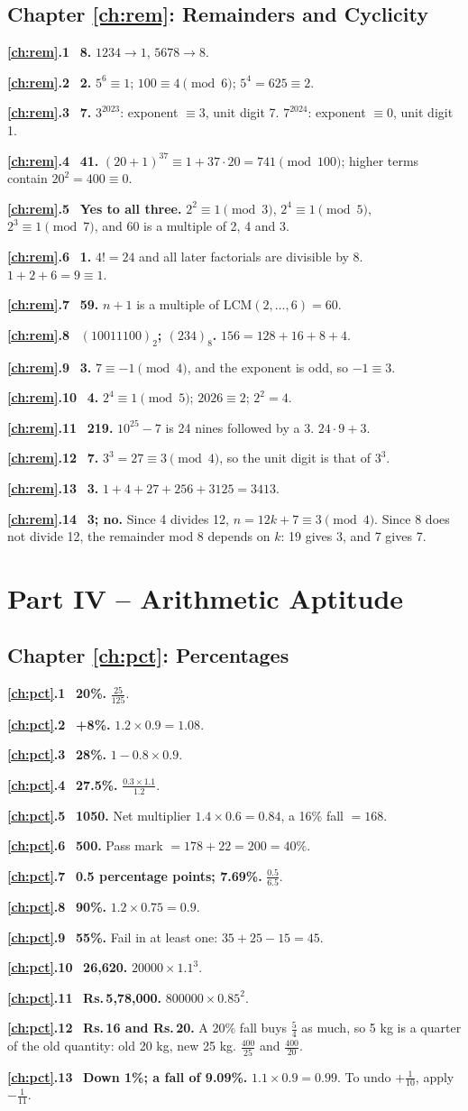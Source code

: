 \documentclass[11pt,a4paper,openany]{report}
\newcommand{\Rs}{Rs.\,}
\newcommand{\solchapter}[2]{\subsection*{Chapter \ref*{#1}: #2}\def\solprefix{\ref*{#1}}}
\newcommand{\sol}[1]{\par\smallskip\textbf{\solprefix.#1}\ }
\begin{document}
\solchapter{ch:rem}{Remainders and Cyclicity}
\sol{1} \textbf{8.} $1234\to1$, $5678\to8$.
\sol{2} \textbf{2.} $5^6\equiv1$; $100\equiv4\pmod6$; $5^4=625\equiv2$.
\sol{3} \textbf{7.} $3^{2023}$: exponent $\equiv3$, unit digit 7. $7^{2024}$: exponent $\equiv0$, unit digit 1.
\sol{4} \textbf{41.} $(20+1)^{37}\equiv1+37\cdot20=741\pmod{100}$; higher terms contain $20^2=400\equiv0$.
\sol{5} \textbf{Yes to all three.} $2^2\equiv1\pmod3$, $2^4\equiv1\pmod5$, $2^3\equiv1\pmod7$, and 60 is a multiple of 2, 4 and 3.
\sol{6} \textbf{1.} $4!=24$ and all later factorials are divisible by 8. $1+2+6=9\equiv1$.
\sol{7} \textbf{59.} $n+1$ is a multiple of LCM$(2,\dots,6)=60$.
\sol{8} \textbf{$(10011100)_2$; $(234)_8$.} $156=128+16+8+4$.
\sol{9} \textbf{3.} $7\equiv-1\pmod4$, and the exponent is odd, so $-1\equiv3$.
\sol{10} \textbf{4.} $2^4\equiv1\pmod5$; $2026\equiv2$; $2^2=4$.
\sol{11} \textbf{219.} $10^{25}-7$ is 24 nines followed by a 3. $24\cdot9+3$.
\sol{12} \textbf{7.} $3^3=27\equiv3\pmod4$, so the unit digit is that of $3^3$.
\sol{13} \textbf{3.} $1+4+27+256+3125=3413$.
\sol{14} \textbf{3; no.} Since 4 divides 12, $n=12k+7\equiv3\pmod4$. Since 8 does not divide 12, the remainder mod 8 depends on $k$: 19 gives 3, and 7 gives 7.
\section*{Part IV -- Arithmetic Aptitude}

\solchapter{ch:pct}{Percentages}
\sol{1} \textbf{20\%.} $\frac{25}{125}$.
\sol{2} \textbf{+8\%.} $1.2\times0.9=1.08$.
\sol{3} \textbf{28\%.} $1-0.8\times0.9$.
\sol{4} \textbf{27.5\%.} $\frac{0.3\times1.1}{1.2}$.
\sol{5} \textbf{1050.} Net multiplier $1.4\times0.6=0.84$, a 16\% fall $=168$.
\sol{6} \textbf{500.} Pass mark $=178+22=200=40\%$.
\sol{7} \textbf{0.5 percentage points; 7.69\%.} $\frac{0.5}{6.5}$.
\sol{8} \textbf{90\%.} $1.2\times0.75=0.9$.
\sol{9} \textbf{55\%.} Fail in at least one: $35+25-15=45$.
\sol{10} \textbf{26,620.} $20000\times1.1^3$.
\sol{11} \textbf{\Rs5,78,000.} $800000\times0.85^2$.
\sol{12} \textbf{\Rs16 and \Rs20.} A 20\% fall buys $\frac54$ as much, so 5 kg is a quarter of the old quantity: old 20 kg, new 25 kg. $\frac{400}{25}$ and $\frac{400}{20}$.
\sol{13} \textbf{Down 1\%; a fall of 9.09\%.} $1.1\times0.9=0.99$. To undo $+\frac1{10}$, apply $-\frac1{11}$.
\end{document}

